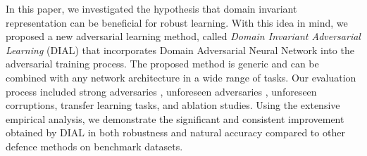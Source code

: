In this paper, we investigated the hypothesis that domain invariant representation can be beneficial for robust learning. With this idea in mind, we proposed a new adversarial learning method, called \textit{Domain Invariant Adversarial Learning} (DIAL) that incorporates Domain Adversarial Neural Network into the adversarial training process.
The proposed method is generic and can be combined with any network architecture in a wide range of tasks. Our evaluation process included strong adversaries 
, unforeseen adversaries 
, unforeseen corruptions, transfer learning tasks, and ablation studies. Using the extensive empirical analysis, we demonstrate the significant and consistent improvement obtained by DIAL in both robustness and natural accuracy compared to other defence methods on benchmark datasets.
